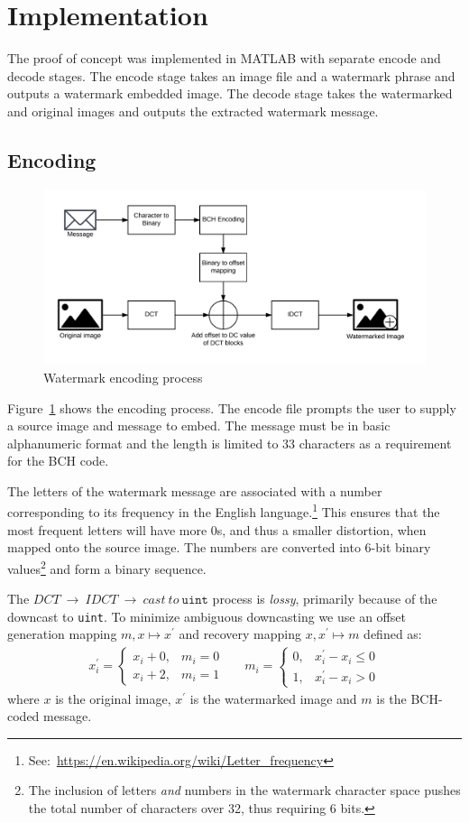 \section{Implementation}\label{sec:impl}
The proof of concept was implemented in MATLAB with separate encode and decode stages.
The encode stage takes an image file and a watermark phrase and outputs a watermark embedded image.
The decode stage takes the watermarked and original images and outputs the extracted watermark message.

\subsection{Encoding}\label{sec:enc}
\begin{figure}[tbph]
  \centering
  \includegraphics[width=0.75\linewidth]{graphics/encode}
  \caption{Watermark encoding process}
  \label{fig:encode}
\end{figure}

Figure~\ref{fig:encode} shows the encoding process.
The encode file prompts the user to supply a source image and message to embed.
The message must be in basic alphanumeric format and the length is limited to 33 characters as a requirement for the BCH code.

The letters of the watermark message are associated with a number corresponding to its frequency in the English language.\footnote{See:\ \url{https://en.wikipedia.org/wiki/Letter_frequency}}
This ensures that the most frequent letters will have more 0s, and thus a smaller distortion, when mapped onto the source image.
The numbers are converted into 6-bit binary values\footnote{The inclusion of letters \textit{and} numbers in the watermark character space pushes the total number of characters over 32, thus requiring 6 bits.} and form a binary sequence.

The $DCT~\rightarrow~IDCT~\rightarrow~cast~to~\texttt{uint}$ process is \textit{lossy}, primarily because of the downcast to \texttt{uint}.
To minimize ambiguous downcasting we use an offset generation mapping $m,x \mapsto x^{\prime}$ and recovery mapping $ x,x^{\prime} \mapsto m$ defined as:
\begin{align*}
x^{\prime}_i = \begin{cases}
x_i + 0, & m_i = 0\\
x_i + 2, & m_i = 1
\end{cases}
&&
m_i = \begin{cases}
0, & x^{\prime}_i - x_i \le 0 \\
1, & x^{\prime}_i - x_i> 0
\end{cases}
\end{align*}
where $x$ is the original image, $x^{\prime}$ is the watermarked image and $m$ is the BCH-coded message.

